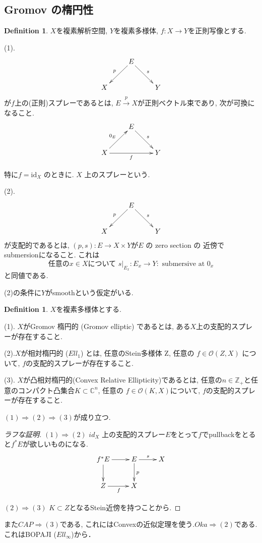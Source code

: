 \documentclass[dvipdfmx,a4paper,11pt]{article} %
\theoremstyle{definition}
\newtheorem{defn}[thm]{Definition}
\theoremstyle{remark}
\numberwithin{equation}{section}
\newcommand{\N}{\mathbb{Z}_+}
\begin{document}
\subsection{ Gromov の楕円性}
\begin{defn}
$X$を複素解析空間, $Y$を複素多様体, $ f:X\longrightarrow Y$を正則写像とする.

(1).
\[
\xymatrix{
& E \ar[dr]^s \ar[dl]_p& \\
X && Y
}
\]
が$f$上の(正則)スプレーであるとは, 
$E\overset{p}{\longrightarrow}X$が正則ベクトル束であり, 次が可換になること. 
\[
\xymatrix{
& E \ar[dr]^s & \\
X \ar[ur]^{0_E} \ar[rr]_f && Y
}
\]

特に\(f=\mathrm{id}_X\) のときに.
\(X\) 上のスプレーという.


(2).
\[
\xymatrix{
& E \ar[dl]_p \ar[dr]^s & \\
X && Y
}
\]
が支配的であるとは, 
$(p,s):E\longrightarrow X\times Y$が$E$ の zero section の 近傍で submersionになること. 
これは
$$
\text{任意の$x\in X$について } s|_{E_x}: E_x\longrightarrow Y: \text{ submersive at } 0_x 
$$
と同値である. 
\end{defn}
(2)の条件に$Y$がsmoothという仮定がいる. 
\begin{defn}
$X$を複素多様体とする. 


(1). 
$X$がGromov 楕円的 (Gromov elliptic)
であるとは, ある$X$上の支配的スプレーが存在すること. 

(2).$X$が相対楕円的 ($Ell_1$)
とは, 任意のStein多様体 Z, 任意の $f\in \mathcal{O}(Z,X)$
について, $f$の支配的スプレーが存在すること. 

(3). $X$が凸相対楕円的(Convex Relative Ellipticity)であるとは, 
任意の$n \in \N$と任意のコンパクト凸集合$ K\subset \mathbb C^n$, 任意の
$f\in \mathcal{O}(K,X)$について, $f$の支配的スプレーが存在すること. 
\end{defn}


$(1)\Longrightarrow(2)\Longrightarrow(3)$が成り立つ. 

\begin{proof}[ラフな証明]
$(1)\Longrightarrow(2)$
\(id_X\) 上の支配的スプレー$E$をとって$f$でpullbackをとると$f^{*}E$が欲しいものになる.
\[
\xymatrix{
f^*E \ar[r] \ar[d] & E \ar[r]^s \ar[d]^p & X\\
Z \ar[r]_f & X &
}
\]

$(2)\Longrightarrow(3)$ $K \subset Z$となるStein近傍を持つことから. 
\end{proof}

また$CAP\Longrightarrow(3)$である, これにはConvexの近似定理を使う.$Oka\Longrightarrow(2)$である. これはBOPAJI ($Ell_\infty$)から．
\end{document}
